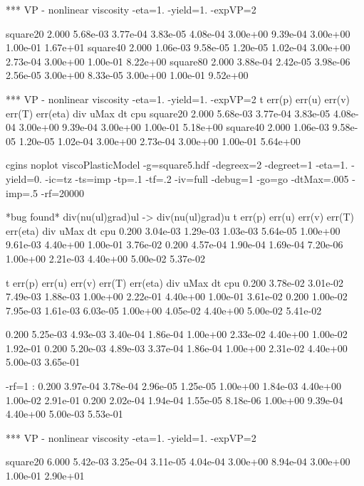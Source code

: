 {%
*** VP - nonlinear viscosity -eta=1. -yield=1. -expVP=2

square20  2.000 5.68e-03 3.77e-04 3.83e-05 4.08e-04 3.00e+00 9.39e-04  3.00e+00 1.00e-01 1.67e+01
square40  2.000 1.06e-03 9.58e-05 1.20e-05 1.02e-04 3.00e+00 2.73e-04  3.00e+00 1.00e-01 8.22e+00
square80  2.000 3.88e-04 2.42e-05 3.98e-06 2.56e-05 3.00e+00 8.33e-05  3.00e+00 1.00e-01 9.52e+00

*** VP - nonlinear viscosity -eta=1. -yield=1. -expVP=2
            t    err(p)   err(u)   err(v)   err(T)   err(eta)    div       uMax     dt       cpu
square20 2.000 5.68e-03 3.77e-04 3.83e-05 4.08e-04 3.00e+00 9.39e-04  3.00e+00 1.00e-01 5.18e+00
square40 2.000 1.06e-03 9.58e-05 1.20e-05 1.02e-04 3.00e+00 2.73e-04  3.00e+00 1.00e-01 5.64e+00


cgins noplot viscoPlasticModel -g=square5.hdf -degreex=2 -degreet=1 -eta=1. -yield=0. -ic=tz -ts=imp -tp=.1 -tf=.2 -iv=full -debug=1 -go=go -dtMax=.005 -imp=.5 -rf=20000

*bug found* div(nu(ul)grad)ul -> div(nu(ul)grad)u
     t    err(p)   err(u)   err(v)   err(T)   err(eta)    div       uMax     dt       cpu
   0.200 3.04e-03 1.29e-03 1.03e-03 5.64e-05 1.00e+00 9.61e-03  4.40e+00 1.00e-01 3.76e-02
   0.200 4.57e-04 1.90e-04 1.69e-04 7.20e-06 1.00e+00 2.21e-03  4.40e+00 5.00e-02 5.37e-02

     t    err(p)   err(u)   err(v)   err(T)   err(eta)    div       uMax     dt       cpu
   0.200 3.78e-02 3.01e-02 7.49e-03 1.88e-03 1.00e+00 2.22e-01  4.40e+00 1.00e-01 3.61e-02
   0.200 1.00e-02 7.95e-03 1.61e-03 6.03e-05 1.00e+00 4.05e-02  4.40e+00 5.00e-02 5.41e-02

   0.200 5.25e-03 4.93e-03 3.40e-04 1.86e-04 1.00e+00 2.33e-02  4.40e+00 1.00e-02 1.92e-01
   0.200 5.20e-03 4.89e-03 3.37e-04 1.86e-04 1.00e+00 2.31e-02  4.40e+00 5.00e-03 3.65e-01


-rf=1 : 
   0.200 3.97e-04 3.78e-04 2.96e-05 1.25e-05 1.00e+00 1.84e-03  4.40e+00 1.00e-02 2.91e-01
   0.200 2.02e-04 1.94e-04 1.55e-05 8.18e-06 1.00e+00 9.39e-04  4.40e+00 5.00e-03 5.53e-01

*** VP - nonlinear viscosity -eta=1. -yield=1. -expVP=2

square20
     6.000 5.42e-03 3.25e-04 3.11e-05 4.04e-04 3.00e+00 8.94e-04  3.00e+00 1.00e-01 2.90e+01



}
